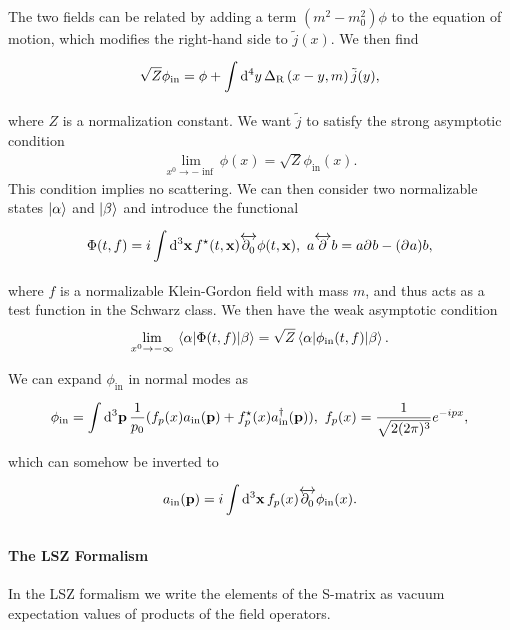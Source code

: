 The two fields can be related by adding a term $(m^{2} - m_{0}^{2})\phi$ to the equation of motion, which modifies the right-hand side to $\tilde{j}(x)$. We then find
\begin{align*}
	\sqrt{Z}\phi_{\text{in}} = \phi + \int\limits_{}^{}\dd[4]{y}\Delta_{\text{R}}\left(x - y, m\right)\tilde{j}(y),
\end{align*}
where $Z$ is a normalization constant. We want $\tilde{j}$ to satisfy the strong asymptotic condition
\begin{align*}
	\lim\limits_{x^{0}\to -\inf}\phi(x) = \sqrt{Z}\phi_{\text{in}}(x).
\end{align*}
This condition implies no scattering. We can then consider two normalizable states $\ket{\alpha}$ and $\ket{\beta}$ and introduce the functional
\begin{align*}
	\Phi(t, f) = i\int\limits_{}^{}\dd[3]{\vb{x}}f^{\star}(t, \vb{x})\overleftrightarrow{\partial^{}_{0}}\phi(t, \vb{x}),\ a\overleftrightarrow{\partial^{}_{}}b = a\partial^{}_{}b - (\partial^{}_{}a)b,
\end{align*}
where $f$ is a normalizable Klein-Gordon field with mass $m$, and thus acts as a test function in the Schwarz class. We then have the weak asymptotic condition
\begin{align*}
	\lim\limits_{x^{0} \to -\infty}\mel{\alpha}{\Phi(t, f)}{\beta} = \sqrt{Z}\mel{\alpha}{\phi_{\text{in}}(t, f)}{\beta}.
\end{align*}

We can expand $\phi_{\text{in}}$ in normal modes as
\begin{align*}
	\phi_{\text{in}} = \int\limits_{}^{}\dd[3]{\vb{p}}\frac{1}{p_{0}}(f_{p}(x)a_{\text{in}}(\vb{p}) + f_{p}^{\star}(x)a_{\text{in}}^{\dagger}(\vb{p})),\ f_{p}(x) = \frac{1}{\sqrt{2(2\pi)^{3}}}e^{-ipx},
\end{align*}
which can somehow be inverted to
\begin{align*}
	a_{\text{in}}(\vb{p}) = i\int\limits_{}^{}\dd[3]{\vb{x}}f_{p}(x)\overleftrightarrow{\partial^{}_{0}}\phi_{\text{in}}(x).
\end{align*}

\paragraph{The LSZ Formalism}
In the LSZ formalism we write the elements of the S-matrix as vacuum expectation values of products of the field operators.

